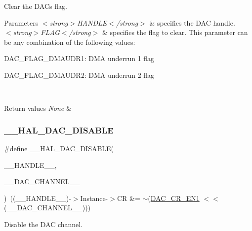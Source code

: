 Clear the D\+AC\textquotesingle{}s flag. 


\begin{DoxyParams}{Parameters}
{\em $<$strong$>$\+H\+A\+N\+D\+L\+E$<$/strong$>$} & specifies the D\+AC handle. \\
\hline
{\em $<$strong$>$\+F\+L\+A\+G$<$/strong$>$} & specifies the flag to clear. This parameter can be any combination of the following values\+: \begin{DoxyItemize}
\item D\+A\+C\+\_\+\+F\+L\+A\+G\+\_\+\+D\+M\+A\+U\+D\+R1\+: D\+MA underrun 1 flag \item D\+A\+C\+\_\+\+F\+L\+A\+G\+\_\+\+D\+M\+A\+U\+D\+R2\+: D\+MA underrun 2 flag \end{DoxyItemize}
\\
\hline
\end{DoxyParams}

\begin{DoxyRetVals}{Return values}
{\em None} & \\
\hline
\end{DoxyRetVals}
\mbox{\label{group___d_a_c___exported___macros_gaccf3ac58df83aca87b760d8ea299cc1c}} 
\subsubsection{\texorpdfstring{\_\_HAL\_DAC\_DISABLE}{\_\_HAL\_DAC\_DISABLE}}
{\footnotesize\ttfamily \#define \+\_\+\+\_\+\+H\+A\+L\+\_\+\+D\+A\+C\+\_\+\+D\+I\+S\+A\+B\+LE(\begin{DoxyParamCaption}\item[{}]{\+\_\+\+\_\+\+H\+A\+N\+D\+L\+E\+\_\+\+\_\+,  }\item[{}]{\+\_\+\+\_\+\+D\+A\+C\+\_\+\+C\+H\+A\+N\+N\+E\+L\+\_\+\+\_\+ }\end{DoxyParamCaption})~((\+\_\+\+\_\+\+H\+A\+N\+D\+L\+E\+\_\+\+\_\+)-\/$>$Instance-\/$>$CR \&=  $\sim$(\mbox{\hyperlink{group___peripheral___registers___bits___definition_gabd8cedbb3dda03d56ac0ba92d2d9cefd}{D\+A\+C\+\_\+\+C\+R\+\_\+\+E\+N1}} $<$$<$ (\+\_\+\+\_\+\+D\+A\+C\+\_\+\+C\+H\+A\+N\+N\+E\+L\+\_\+\+\_\+)))}



Disable the D\+AC channel. 


